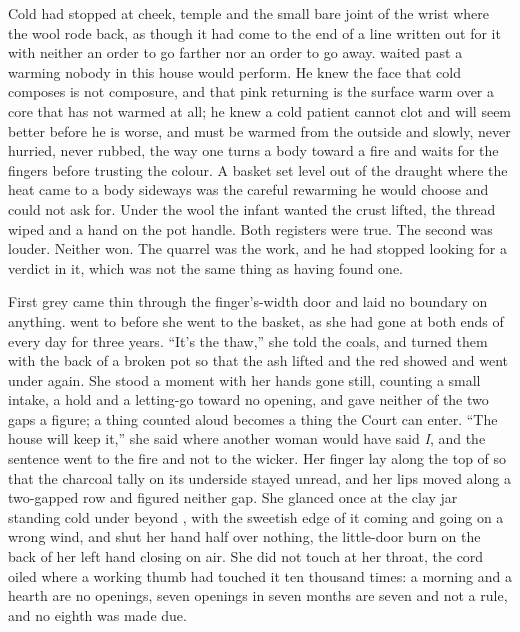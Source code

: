 Cold had stopped at cheek, temple and the small bare joint of the wrist where the wool rode back, as though it had come to the end of a line written out for it with neither an order to go farther nor an order to go away.  waited past a warming nobody in this house would perform. He knew the face that cold composes is not composure, and that pink returning is the surface warm over a core that has not warmed at all; he knew a cold patient cannot clot and will seem better before he is worse, and must be warmed from the outside and slowly, never hurried, never rubbed, the way one turns a body toward a fire and waits for the fingers before trusting the colour. A basket set level out of the draught where the heat came to a body sideways was the careful rewarming he would choose and could not ask for. Under the wool the infant wanted the crust lifted, the thread wiped and a hand on the pot handle. Both registers were true. The second was louder. Neither won. The quarrel was the work, and he had stopped looking for a verdict in it, which was not the same thing as having found one.

\scenebreak

First grey came thin through the finger's-width door and laid no boundary on anything.  went to  before she went to the basket, as she had gone at both ends of every day for three years. “It's the thaw,” she told the coals, and turned them with the back of a broken pot so that the ash lifted and the red showed and went under again. She stood a moment with her hands gone still, counting a small intake, a hold and a letting-go toward no opening, and gave neither of the two gaps a figure; a thing counted aloud becomes a thing the Court can enter. “The house will keep it,” she said where another woman would have said \emph{I}, and the sentence went to the fire and not to the wicker. Her finger lay along the top of  so that the charcoal tally on its underside stayed unread, and her lips moved along a two-gapped row and figured neither gap. She glanced once at the clay jar standing cold under  beyond , with the sweetish edge of it coming and going on a wrong wind, and shut her hand half over nothing, the little-door burn on the back of her left hand closing on air. She did not touch  at her throat, the cord oiled where a working thumb had touched it ten thousand times: a morning and a hearth are no openings, seven openings in seven months are seven and not a rule, and no eighth was made due.

